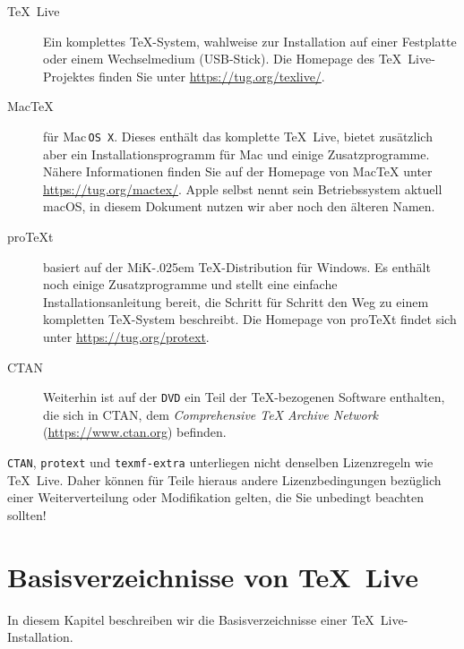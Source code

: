 \documentclass[12pt,ngerman,a4paper,fullparskip]{report}
\newcommand{\TL}{\TeX\ Live\xspace}
\newcommand{\acro}[1]{\texttt{#1}}
\newcommand{\dirname}[1]{\texttt{#1}}
\newcommand{\pkgname}[1]{\texttt{#1}}
\newcommand\MIKTEX{MiK\kern-.025em \TeX}%
\providecommand*{\CTAN}{\acro{CTAN}\xspace}
\providecommand*{\DVD}{\acro{DVD}\xspace}
\providecommand*{\MacOSX}{Mac\,\acro{OS\,X}\xspace}
\begin{document}
\begin{description}
\item[\TL] Ein komplettes \TeX-System, wahlweise zur Installation auf einer Festplatte oder einem Wechselmedium (USB-Stick). Die Homepage des \TL-Projektes finden Sie unter \url{https://tug.org/texlive/}.
\item[Mac\TeX] für \MacOSX. Dieses enthält das komplette \TL, bietet zusätzlich aber ein Installationsprogramm für Mac und einige Zusatzprogramme. Nähere Informationen finden Sie auf der Homepage von Mac\TeX{} unter \url{https://tug.org/mactex/}. Apple selbst nennt sein Betriebssystem aktuell macOS, in diesem Dokument nutzen wir aber noch den älteren Namen.
\item[pro\TeX{}t] basiert auf der \MIKTEX-Distribution für Windows. Es enthält noch einige Zusatzprogramme und stellt eine einfache Installationsanleitung bereit, die Schritt für Schritt den Weg zu einem kompletten \TeX-System beschreibt. Die Homepage von pro\TeX{}t findet sich unter \url{https://tug.org/protext}. 
\item[CTAN] Weiterhin ist auf der \DVD{} ein Teil der \TeX-bezogenen Software enthalten, die sich
in CTAN, dem \emph{Comprehensive \TeX{} Archive Network} (\url{https://www.ctan.org}) befinden.
\end{description}

\CTAN{}, \pkgname{protext} und \dirname{texmf-extra} unterliegen nicht denselben Lizenzregeln wie \TL. Daher können für Teile hieraus andere Lizenzbedingungen bezüglich einer Weiterverteilung oder
Modifikation gelten, die Sie unbedingt beachten sollten!

\section{Basisverzeichnisse von \TL}\label{sec:tld}

In diesem Kapitel beschreiben wir die Basisverzeichnisse einer \TL-Installation.
\end{document}
